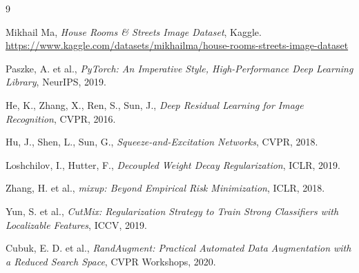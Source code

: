 \documentclass[12pt,a4paper]{article}
\begin{document}
\begin{thebibliography}{9}

Mikhail Ma, \textit{House Rooms \& Streets Image Dataset}, Kaggle.
\url{https://www.kaggle.com/datasets/mikhailma/house-rooms-streets-image-dataset}

Paszke, A. et al., \textit{PyTorch: An Imperative Style, High-Performance Deep Learning Library}, NeurIPS, 2019.

He, K., Zhang, X., Ren, S., Sun, J., \textit{Deep Residual Learning for Image Recognition}, CVPR, 2016.

Hu, J., Shen, L., Sun, G., \textit{Squeeze-and-Excitation Networks}, CVPR, 2018.

Loshchilov, I., Hutter, F., \textit{Decoupled Weight Decay Regularization}, ICLR, 2019.

Zhang, H. et al., \textit{mixup: Beyond Empirical Risk Minimization}, ICLR, 2018.

Yun, S. et al., \textit{CutMix: Regularization Strategy to Train Strong Classifiers with Localizable Features}, ICCV, 2019.

Cubuk, E. D. et al., \textit{RandAugment: Practical Automated Data Augmentation with a Reduced Search Space}, CVPR Workshops, 2020.

\end{thebibliography}
\end{document}

